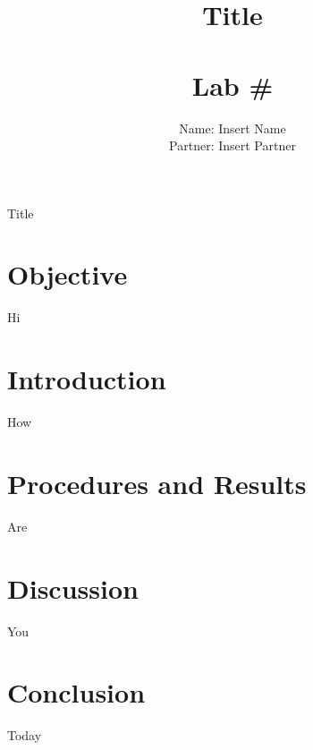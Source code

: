 \documentclass[11pt, titlepage]{article}
\title{\textbf{Title} \\ \ \\ \large Lab \# }
\author{Name: Insert Name \\ Partner: Insert Partner}
\date{}
\begin{document}
\maketitle

\begin{center}
\LARGE Title
\end{center}

\section*{Objective}
Hi

\section*{Introduction}
How

\section*{Procedures and Results}
Are

\section*{Discussion}
You

\section*{Conclusion}
Today
\end{document}

